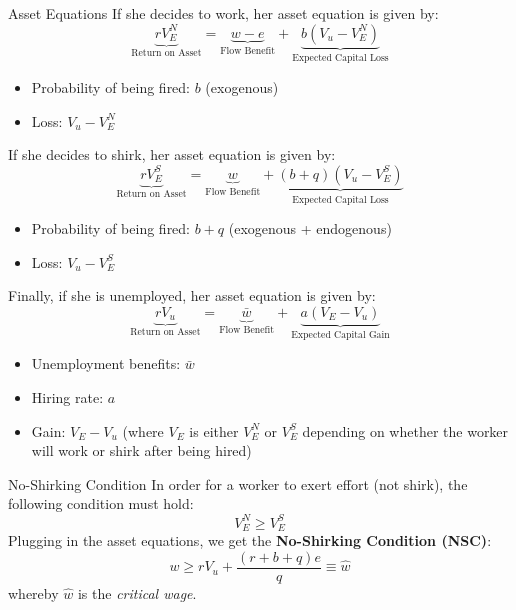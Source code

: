 \documentclass{beamer}
\begin{document}
\begin{frame}[allowframebreaks]{Asset Equations}
    If she decides to work, her asset equation is given by:
    \begin{equation*}
  \underbrace{rV_E^N}_{\text{Return on Asset}}
  = \underbrace{w - e}_{\text{Flow Benefit}}
  + \underbrace{b(V_u - V_E^N)}_{\text{Expected Capital Loss}}
\end{equation*}
    \begin{itemize}
        \item Probability of being fired: $b$ (exogenous)
        \item Loss: $V_u - V_E^N$
    \end{itemize}
    If she decides to shirk, her asset equation is given by:
    \begin{equation*}
        \underbrace{rV_E^S}_{\text{Return on Asset}} = \underbrace{w}_{\text{Flow Benefit}} + \underbrace{(b + q)(V_u - V_E^S)}_{\text{Expected Capital Loss}}
    \end{equation*}
    \begin{itemize}
        \item Probability of being fired: $b +q$ (exogenous + endogenous)
        \item Loss: $V_u - V_E^S$
    \end{itemize}
    \framebreak
    Finally, if she is unemployed, her asset equation is given by:
    \begin{equation*}
        \underbrace{rV_u}_{\text{Return on Asset}} = \underbrace{\bar{w}}_{\text{Flow Benefit}} + \underbrace{a(V_E - V_u)}_{\text{Expected Capital Gain}}
    \end{equation*}
    \begin{itemize}
        \item Unemployment benefits: $\bar{w}$
        \item Hiring rate: $a$
        \item Gain: $V_E - V_u$ (where $V_E$ is either $V_E^N$ or $V_E^S$ depending on whether the worker will work or shirk after being hired)
    \end{itemize}
\end{frame}

\begin{frame}{No-Shirking Condition}
    In order for a worker to exert effort (not shirk), the following condition must hold:
    $$V_E^N \geq V_E^S$$
    Plugging in the asset equations, we get the \textbf{No-Shirking Condition (NSC)}:
    $$w \ge rV_u + \frac{(r + b + q)e}{q} \equiv \hat{w}$$
    whereby $\hat{w}$ is the \textit{critical wage}.
\end{frame}
\end{document}
